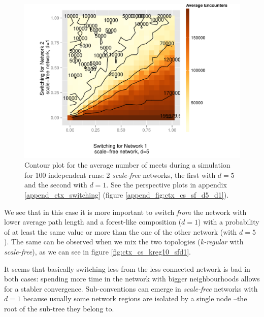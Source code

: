 \documentclass[preprint,number]{elsarticle}
\begin{document}
\begin{figure}[H]
	\centering
	\includegraphics[width=1\linewidth]{"../analysis/pdf/context_switching_sf_d5_d1_switching_contour"}
	\begin{minipage}{0.9\textwidth}
		\caption{Contour plot for the average number of meets during a simulation for 100 independent runs: 2 \textit{scale-free} networks, the first with $d=5$ and the second with $d=1$. See the perspective plots in  appendix \ref{append_ctx_switching} (figure \ref{append_fig:ctx_cs_sf_d5_d1}).
		}
		\label{fig:ctx_cs_sf_d5_d1}
	\end{minipage}
\end{figure}

We see that in this case it is more important to switch \textit{from} the network with lower average path length and a forest-like composition ($d=1$) with a probability of at least the same value or more than the one of the other network (with $d=5$). The same can be observed when we mix the two topologies (\textit{k-regular} with \textit{scale-free}), as we can see in figure \ref{fig:ctx_cs_kreg10_sfd1}.

It seems that basically switching less from the less connected network is bad in both cases: spending more time in the network with bigger neighbourhoods allows for a stabler convergence. Sub-conventions can emerge in \textit{scale-free} networks with $d=1$ because usually some network regions are isolated by a single node --the root of the sub-tree they belong to. 
\end{document}
